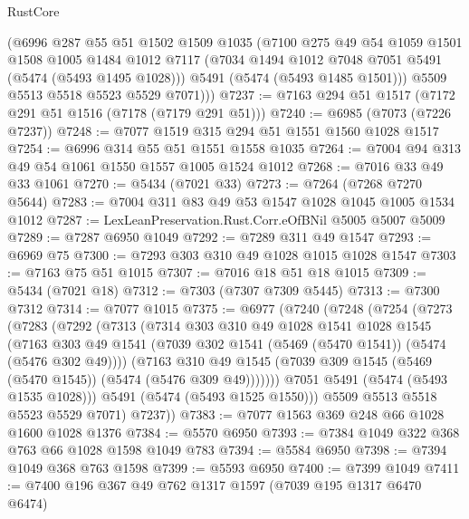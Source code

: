 \begin{lexlean}{RustCore}
\begin{coremodule}
        (@6996
          @287
          @55
          @51
          @1502
          @1509
          @1035
          (@7100
            @275
            @49
            @54
            @1059
            @1501
            @1508
            @1005
            @1484
            @1012
            @7117
            (@7034 @1494 @1012 @7048 @7051 @5491 (@5474 (@5493 @1495 @1028)))
            @5491
            (@5474 (@5493 @1485 @1501)))
          @5509
          @5513
          @5518
          @5523
          @5529
          @7071)))
@7237 := @7163 @294 @51 @1517 (@7172 @291 @51 @1516 (@7178 (@7179 @291 @51)))
@7240 := @6985 (@7073 (@7226 @7237))
@7248 := @7077 @1519 @315 @294 @51 @1551 @1560 @1028 @1517
@7254 := @6996 @314 @55 @51 @1551 @1558 @1035
@7264 := @7004 @94 @313 @49 @54 @1061 @1550 @1557 @1005 @1524 @1012
@7268 := @7016 @33 @49 @33 @1061
@7270 := @5434 (@7021 @33)
@7273 := @7264 (@7268 @7270 @5644)
@7283 := @7004 @311 @83 @49 @53 @1547 @1028 @1045 @1005 @1534 @1012
@7287 := LexLeanPreservation.Rust.Corr.eOfBNil @5005 @5007 @5009
@7289 := @7287 @6950 @1049
@7292 := @7289 @311 @49 @1547
@7293 := @6969 @75
@7300 := @7293 @303 @310 @49 @1028 @1015 @1028 @1547
@7303 := @7163 @75 @51 @1015
@7307 := @7016 @18 @51 @18 @1015
@7309 := @5434 (@7021 @18)
@7312 := @7303 (@7307 @7309 @5445)
@7313 := @7300 @7312
@7314 := @7077 @1015
@7375 := @6977
    (@7240
      (@7248
        (@7254
          (@7273
            (@7283
              (@7292
                (@7313
                  (@7314
                    @303
                    @310
                    @49
                    @1028
                    @1541
                    @1028
                    @1545
                    (@7163
                      @303
                      @49
                      @1541
                      (@7039 @302 @1541 (@5469 (@5470 @1541)) (@5474 (@5476 @302 @49))))
                    (@7163
                      @310
                      @49
                      @1545
                      (@7039 @309 @1545 (@5469 (@5470 @1545)) (@5474 (@5476 @309 @49)))))))
              @7051
              @5491
              (@5474 (@5493 @1535 @1028)))
            @5491
            (@5474 (@5493 @1525 @1550)))
          @5509
          @5513
          @5518
          @5523
          @5529
          @7071)
        @7237))
@7383 := @7077 @1563 @369 @248 @66 @1028 @1600 @1028 @1376
@7384 := @5570 @6950
@7393 := @7384 @1049 @322 @368 @763 @66 @1028 @1598 @1049 @783
@7394 := @5584 @6950
@7398 := @7394 @1049 @368 @763 @1598
@7399 := @5593 @6950
@7400 := @7399 @1049
@7411 := @7400 @196 @367 @49 @762 @1317 @1597 (@7039 @195 @1317 @6470 @6474)

\end{coremodule}
\end{lexlean}
